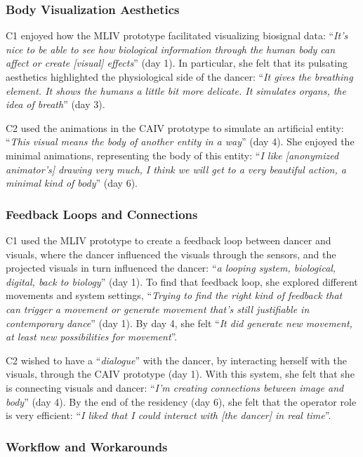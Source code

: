 \subsubsection{Body Visualization Aesthetics}

C1 enjoyed how the MLIV prototype facilitated visualizing biosignal data: “\textit{It's nice to be able to  see how biological information through the human body can affect or create [visual] effects}” (day 1). In particular, she felt that its pulsating aesthetics  highlighted the physiological side of the dancer: “\textit{It gives the breathing element. It shows the humans a little bit more delicate. It simulates organs, the idea of breath}” (day 3).

C2 used the animations in the CAIV prototype to simulate an artificial entity: “\textit{This visual means the body of another entity in a way}” (day 4). She enjoyed the minimal animations, representing the body of this entity: “\textit{I like [anonymized animator’s] drawing very much, I think we will get to a very beautiful action, a minimal kind of body}” (day 6).

\subsubsection{Feedback Loops and Connections}

C1 used the MLIV prototype to create a feedback loop between dancer and visuals, where the dancer influenced the visuals through the sensors, and the projected visuals in turn influenced the dancer: “\textit{a looping system, biological, digital, back to biology}” (day 1). To find that feedback loop, she explored different movements and system settings, “\textit{Trying to find the right kind of feedback that can trigger a movement or generate movement that's still justifiable in contemporary dance}” (day 1). By day 4, she felt “\textit{It did generate new movement, at least new possibilities for movement}”.

C2 wished to have a “\textit{dialogue}” with the dancer, by interacting herself with the visuals, through the CAIV prototype (day 1). With this system, she felt that she is connecting visuals and dancer: “\textit{I'm creating connections between image and body}” (day 4). By the end of the residency (day 6), she felt that the operator role is very efficient: “\textit{I liked that I could interact with [the dancer] in real time}”.

\subsubsection{Workflow and Workarounds}\label{subsec:modi_worksflow_c2}

